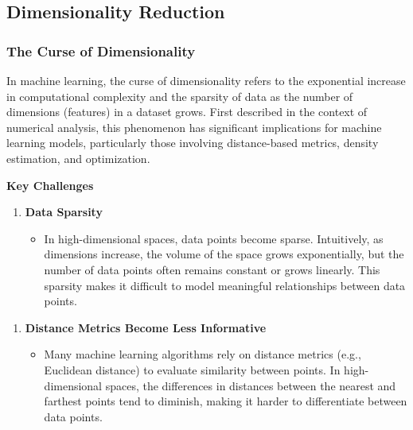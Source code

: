 \documentclass{article}
\providecommand{\tightlist}{%
      \setlength{\itemsep}{0pt}\setlength{\parskip}{0pt}}
\begin{document}
    \subsection{Dimensionality Reduction}\label{dimensionality-reduction}

    \subsubsection{The Curse of
Dimensionality}\label{the-curse-of-dimensionality}

In machine learning, the curse of dimensionality refers to the
exponential increase in computational complexity and the sparsity of
data as the number of dimensions (features) in a dataset grows. First
described in the context of numerical analysis, this phenomenon has
significant implications for machine learning models, particularly those
involving distance-based metrics, density estimation, and optimization.

\textbf{Key Challenges}

\begin{enumerate}
\def\labelenumi{\arabic{enumi}.}
\tightlist
\item
  \textbf{Data Sparsity}

  \begin{itemize}
  \tightlist
  \item
    In high-dimensional spaces, data points become sparse. Intuitively,
    as dimensions increase, the volume of the space grows exponentially,
    but the number of data points often remains constant or grows
    linearly. This sparsity makes it difficult to model meaningful
    relationships between data points.
  \end{itemize}
\end{enumerate}

\begin{enumerate}
\def\labelenumi{\arabic{enumi}.}
\setcounter{enumi}{1}
\tightlist
\item
  \textbf{Distance Metrics Become Less Informative}

  \begin{itemize}
  \tightlist
  \item
    Many machine learning algorithms rely on distance metrics (e.g.,
    Euclidean distance) to evaluate similarity between points. In
    high-dimensional spaces, the differences in distances between the
    nearest and farthest points tend to diminish, making it harder to
    differentiate between data points.
  \end{itemize}
\end{enumerate}
\end{document}
